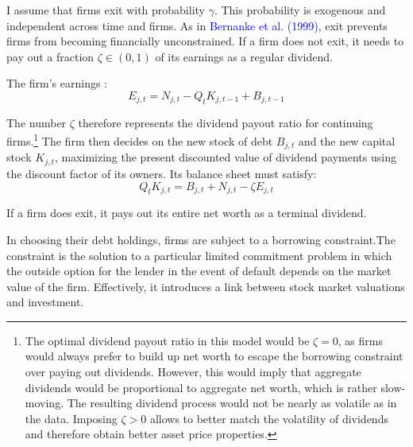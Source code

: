 \documentclass[10pt,math=newtx,citestyle=gb7714-2015,bibstyle=gb7714-2015]{elegantbook}
\begin{document}
{{{			I assume that firms exit with probability $\gamma$. This probability is exogenous and independent across time and firms. As in \textcolor{blue}{Bernanke et al. (1999)}, exit prevents firms from becoming financially unconstrained. If a firm does not exit, it needs to pay out a fraction $\zeta \in (0, 1)$ of its earnings as a regular dividend.
			
			The firm's earnings :
			$$E_{j,t} = N_{j,t}-Q_tK_{j,t-1}+B_{j,t-1}$$
			
			The number $\zeta$ therefore represents the dividend payout ratio for continuing firms.\footnote{The optimal dividend payout ratio in this model would be $\zeta = 0$, as firms would always prefer to build up net worth to escape the borrowing constraint over paying out dividends. However, this would imply that aggregate dividends would be proportional to aggregate net worth, which is rather slow-moving. The resulting dividend process would not be nearly as volatile as in the data. Imposing $\zeta > 0$ allows to better match the volatility of dividends and therefore obtain better asset price properties.} The firm then decides on the new stock of debt $B_{j,t}$ and the new capital stock $K_{j,t}$, maximizing the present discounted value of dividend
			payments using the discount factor of its owners. Its balance sheet must satisfy:
			\begin{equation}
				Q_tK_{j,t} = B_{j,t} + N_{j,t} -\zeta E_{j,t}
			\end{equation}
			
			If a firm does exit, it pays out its entire net worth as a terminal dividend.
			
			In choosing their debt holdings, firms are subject to a borrowing constraint.The constraint is the solution to a particular limited commitment problem in which the outside option for the lender in the event of default depends on the market value of the firm. Effectively, it introduces a link between stock market valuations and investment.
			
}}}
\end{document}
